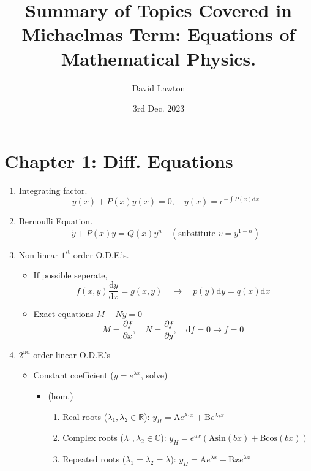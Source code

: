 \documentclass{article}
\title{Summary of Topics Covered in Michaelmas Term: Equations of Mathematical Physics.}
\date{3rd Dec. 2023}
\author{David Lawton}
\begin{document}
\maketitle
\vfill
\tableofcontents
\newpage
\section{Chapter 1: Diff. Equations}
\begin{enumerate}
\item Integrating factor.
\begin{equation}
\dot{y}(x) + P(x) y(x) = 0,\quad y(x)=e^{-\int P(x)\mathrm{d}x}
\end{equation}
\item Bernoulli Equation.
\begin{equation}
\dot{y} + P(x)y = Q(x)y^n \quad (\text{substitute } v=y^{1-n})
\end{equation}
\item Non-linear $1^{\text{st}}$ order O.D.E.'s.
\begin{itemize}
\item If possible seperate,
\begin{equation}
f(x, y)\frac{\mathrm{d}y}{\mathrm{d}x}=g(x,y)\quad\rightarrow\quad p(y)\mathrm{d}y = q(x)\mathrm{d}x
\end{equation}
\item Exact equations $ M + N\dot{y}=0 $
\begin{equation}
M = \frac{\partial f}{\partial x},\quad N = \frac{\partial f}{\partial y},\quad \mathrm{d}f=0 \rightarrow f=0
\end{equation}
\end{itemize}
\item $ 2^{\text{nd}} $ order linear O.D.E.'s
\begin{itemize}
\item Constant coefficient ($ y = e^{\lambda x}$, solve)\\
\begin{itemize}
\item (hom.)
\begin{enumerate}
\item Real roots ($\lambda_1, \lambda_2\in \mathbb{R}$): $y_H = \mathrm{A}e^{\lambda_1 x} + \mathrm{B}e^{\lambda_2 x} $
\item Complex roots ($\lambda_1,\lambda_2 \in \mathbb{C}$): $y_H = e^{ax}\left(\mathrm{A sin}(bx)+\mathrm{B cos}(bx)\right)$
\item Repeated roots ($\lambda_1 = \lambda_2 = \lambda$): $ y_H = \mathrm{A}e^{\lambda x} + \mathrm{B}xe^{\lambda x}$

\end{enumerate}
\end{itemize}
\end{itemize}
\end{enumerate}
\end{document}
